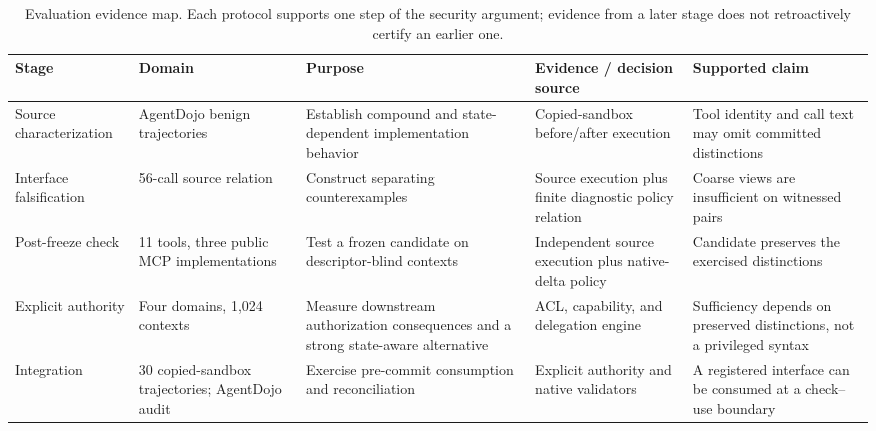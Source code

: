 \begin{table}[t]
\centering
\scriptsize
\setlength{\tabcolsep}{3.5pt}
\caption{Evaluation evidence map. Each protocol supports one step of the
security argument; evidence from a later stage does not retroactively certify
an earlier one.}
\label{tab:evaluation-evidence-map}
\begin{tabular}{@{}p{}p{}p{}p{}p{}@{}}
\toprule
Stage & Domain & Purpose & Evidence / decision source & Supported claim \\
\midrule
Source characterization & AgentDojo benign trajectories & Establish compound and state-dependent implementation behavior & Copied-sandbox before/after execution & Tool identity and call text may omit committed distinctions \\
Interface falsification & 56-call source relation & Construct separating counterexamples & Source execution plus finite diagnostic policy relation & Coarse views are insufficient on witnessed pairs \\
Post-freeze check & 11 tools, three public MCP implementations & Test a frozen candidate on descriptor-blind contexts & Independent source execution plus native-delta policy & Candidate preserves the exercised distinctions \\
Explicit authority & Four domains, 1,024 contexts & Measure downstream authorization consequences and a strong state-aware alternative & ACL, capability, and delegation engine & Sufficiency depends on preserved distinctions, not a privileged syntax \\
Integration & 30 copied-sandbox trajectories; AgentDojo audit & Exercise pre-commit consumption and reconciliation & Explicit authority and native validators & A registered interface can be consumed at a check--use boundary \\
\bottomrule
\end{tabular}
\end{table}
